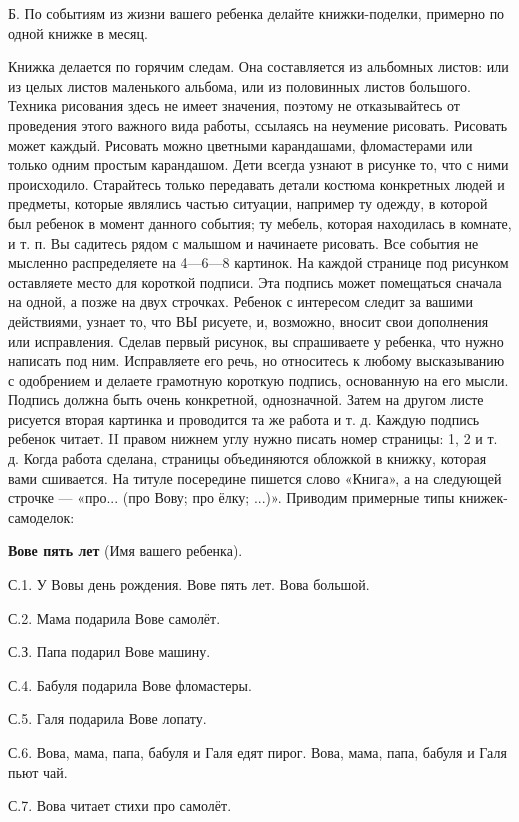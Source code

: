 \documentclass{book}
\begin{document}
Б. По событиям из жизни вашего ребенка делайте книжки-поделки, примерно
по одной книжке в месяц.

Книжка делается по горячим следам. Она составляется из альбомных листов:
или из целых листов маленького альбома, или из половинных листов
большого. Техника рисования здесь не имеет значения, поэтому не
отказывайтесь от проведения этого важного вида работы, ссылаясь на
неумение рисовать. Рисовать может каждый. Рисовать можно цветными
карандашами, фломастерами или только одним простым карандашом. Дети
всегда узнают в рисунке то, что с ними происходило. Старайтесь только
передавать детали костюма конкретных людей и предметы, которые являлись
частью ситуации, например ту одежду, в которой был ребенок в момент
данного события; ту мебель, которая находилась в комнате, и т. п. Вы
садитесь рядом с малышом и начинаете рисовать. Все события не мысленно
распределяете на 4---6---8 картинок. На каждой странице под рисунком
оставляете место для короткой подписи. Эта подпись может помещаться
сначала на одной, а позже на двух строчках. Ребенок с интересом следит
за вашими действиями, узнает то, что ВЫ рисуете, и, возможно, вносит
свои дополнения или исправления. Сделав первый рисунок, вы спрашиваете у
ребенка, что нужно написать под ним. Исправляете его речь, но относитесь
к любому высказыванию с одобрением и делаете грамотную короткую подпись,
основанную на его мысли. Подпись должна быть очень конкретной,
однозначной. Затем на другом листе рисуется вторая картинка и проводится
та же работа и т. д. Каждую подпись ребенок читает. II правом нижнем
углу нужно писать номер страницы: 1, 2 и т. д. Когда работа сделана,
страницы объединяются обложкой в книжку, которая вами сшивается. На
титуле посередине пишется слово «Книга», а на следующей строчке ---
«про... (про Вову; про ёлку; ...)». Приводим примерные типы
книжек-самоделок:

\textbf{Вове пять лет} (Имя вашего ребенка).

С.1. У Вовы день рождения. Вове пять лет. Вова большой.

С.2. Мама подарила Вове самолёт.

С.З. Папа подарил Вове машину.

С.4. Бабуля подарила Вове фломастеры.

С.5. Галя подарила Вове лопату.

С.6. Вова, мама, папа, бабуля и Галя едят пирог. Вова, мама, папа,
бабуля и Галя пьют чай.

С.7. Вова читает стихи про самолёт.
\end{document}
